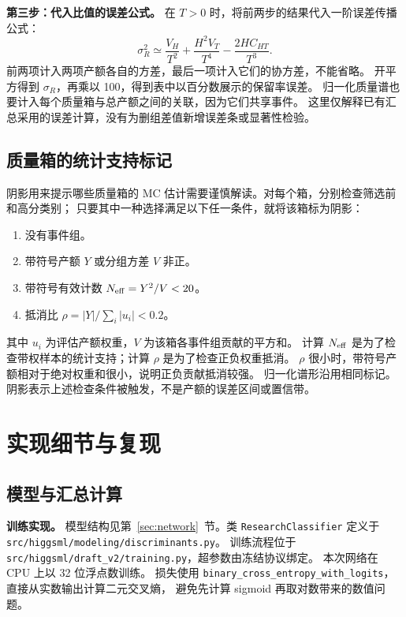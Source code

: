 \documentclass[11pt,a4paper,fontset=fandol,scheme=plain]{ctexart}
\begin{document}
\textbf{第三步：代入比值的误差公式。}
在 $T>0$ 时，将前两步的结果代入一阶误差传播公式：
\[
 \sigma_R^2\simeq\frac{V_H}{T^2}+\frac{H^2V_T}{T^4}-\frac{2H C_{HT}}{T^3}.
\]
前两项计入两项产额各自的方差，最后一项计入它们的协方差，不能省略。
开平方得到 $\sigma_R$，再乘以 100，得到表中以百分数展示的保留率误差。
归一化质量谱也要计入每个质量箱与总产额之间的关联，因为它们共享事件。
这里仅解释已有汇总采用的误差计算，没有为删组差值新增误差条或显著性检验。

\subsection{质量箱的统计支持标记}
阴影用来提示哪些质量箱的 MC 估计需要谨慎解读。对每个箱，分别检查筛选前和高分类别；
只要其中一种选择满足以下任一条件，就将该箱标为阴影：
\begin{enumerate}[leftmargin=1.7em,itemsep=2pt]
\item 没有事件组。
\item 带符号产额 $Y$ 或分组方差 $V$ 非正。
\item 带符号有效计数 $N_{\rm eff}=Y^2/V<20$。
\item 抵消比 $\rho=|Y|/\sum_i|u_i|<0.2$。
\end{enumerate}
其中 $u_i$ 为评估产额权重，$V$ 为该箱各事件组贡献的平方和。
计算 $N_{\rm eff}$ 是为了检查带权样本的统计支持；计算 $\rho$ 是为了检查正负权重抵消。
$\rho$ 很小时，带符号产额相对于绝对权重和很小，说明正负贡献抵消较强。
归一化谱形沿用相同标记。阴影表示上述检查条件被触发，不是产额的误差区间或置信带。

\section{实现细节与复现}\label{app:network}

\subsection{模型与汇总计算}
\textbf{训练实现。} 模型结构见第~\ref{sec:network}~节。类 \texttt{ResearchClassifier} 定义于
\nolinkurl{src/higgsml/modeling/discriminants.py}。
训练流程位于 \nolinkurl{src/higgsml/draft_v2/training.py}，超参数由冻结协议绑定。
本次网络在 CPU 上以 32 位浮点数训练。
损失使用 \texttt{binary\_cross\_entropy\_with\_logits}，直接从实数输出计算二元交叉熵，
避免先计算 sigmoid 再取对数带来的数值问题。
\end{document}
